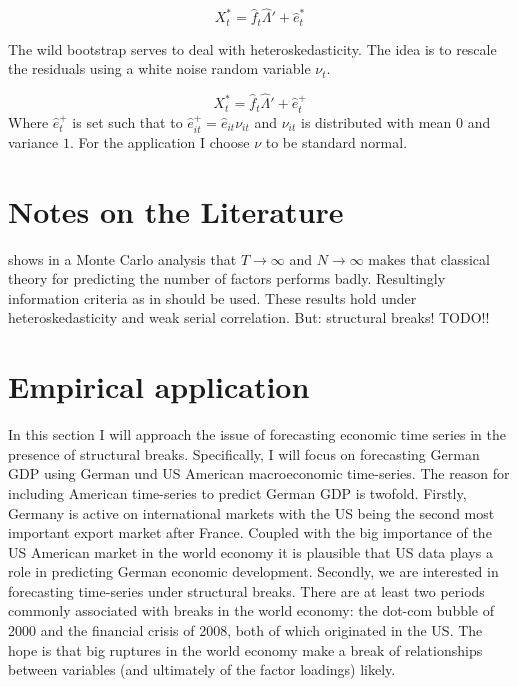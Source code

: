 \documentclass[11pt]{article}
\begin{document}
\begin{equation}
	\label{factor equation, bootstrapped}
	X_t^* = \hat f_t \hat \Lambda' + \hat e_t^*
\end{equation}

The wild bootstrap serves to deal with heteroskedasticity. The idea is to rescale the residuals using a white noise random variable $\nu_t$.

$$X_t^* = \hat f_t \hat \Lambda' + \hat e_t^+$$
Where $\hat e_t^+$ is set such that to $\hat e_{it}^+ = \hat e_{it} \nu_{it}$ and $\nu_{it}$ is distributed with mean $0$ and variance $1$. For the application I choose $\nu$ to be standard normal.




\section{Notes on the Literature}
\citet{cragg1997inferring} shows in a Monte Carlo analysis that $T\rightarrow\infty$ and $N\rightarrow\infty$ makes that classical theory for predicting the number of factors performs badly. Resultingly information criteria as in \citet{bai2002determining} should be used. These results hold under heteroskedasticity and weak serial correlation. But: structural breaks! TODO!!




\section{Empirical application}
In this section I will approach the issue of forecasting economic time series in the presence of structural breaks. Specifically, I will focus on forecasting German GDP using German und US American macroeconomic time-series. The reason for including American time-series to predict German GDP is twofold. Firstly, Germany is active on international markets with the US being the second most important export market after France. Coupled with the big importance of the US American market in the world economy it is plausible that US data plays a role in predicting German economic development. Secondly, we are interested in forecasting time-series under structural breaks. There are at least two periods commonly associated with breaks in the world economy: the dot-com bubble of 2000 and the financial crisis of 2008, both of which originated in the US. The hope is that big ruptures in the world economy make a break of relationships between variables (and ultimately of the factor loadings) likely.
\end{document}
